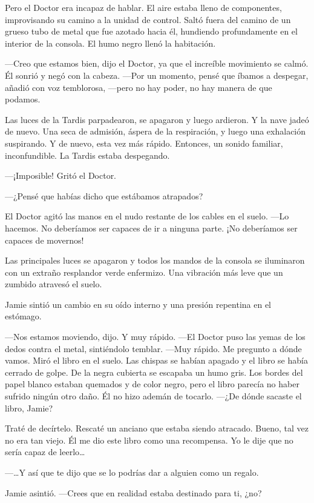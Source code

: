 Pero el Doctor era incapaz de hablar. El aire estaba lleno de
componentes, improvisando su camino a la unidad de control. Saltó fuera
del camino de un grueso tubo de metal que fue azotado hacia él,
hundiendo profundamente en el interior de la consola. El humo negro
llenó la habitación.

---Creo que estamos bien, dijo el Doctor, ya que el increíble movimiento
se calmó. Él sonrió y negó con la cabeza. ---Por un momento, pensé que
íbamos a despegar, añadió  con voz temblorosa,  ---pero no hay poder, no
hay manera de que podamos.

Las luces de la Tardis parpadearon, se apagaron y luego ardieron. Y la
nave jadeó de nuevo. Una seca de admisión, áspera de la respiración, y
luego una exhalación suspirando. Y de nuevo, esta vez más rápido.
Entonces, un sonido familiar, inconfundible. La Tardis estaba
despegando.

---¡Imposible! Gritó el Doctor.

---¿Pensé que habías dicho que estábamos atrapados?

El Doctor agitó las manos en el nudo restante de los cables en el suelo.
---Lo hacemos. No deberíamos ser capaces de ir a ninguna parte. ¡No
deberíamos ser capaces de movernos!

Las principales luces se apagaron y todos los mandos de la consola se
iluminaron con un extraño resplandor verde enfermizo. Una vibración más
leve que un zumbido  atravesó el  suelo.

Jamie sintió un cambio en su oído interno y una presión repentina en el
estómago.

---Nos estamos moviendo, dijo. Y muy rápido. ---El Doctor puso las yemas
de los dedos contra el metal, sintiéndolo temblar. ---Muy rápido. Me
pregunto a dónde vamos. Miró el libro en el suelo. Las chispas se habían
apagado y el libro se había cerrado de golpe. De la negra cubierta se
escapaba un humo gris. Los bordes del papel blanco estaban quemados y de
color negro, pero el libro parecía no haber sufrido ningún otro daño. Él
no hizo ademán de tocarlo. ---¿De dónde sacaste el libro, Jamie?

Traté de decírtelo. Rescaté un anciano que estaba siendo atracado.
Bueno, tal vez no era tan viejo. Él me dio este libro como una
recompensa. Yo le dije que no sería capaz de leerlo\ldots{}

---\ldots{}Y así que te dijo que se lo podrías dar a alguien como un
regalo.

Jamie asintió. ---Crees que en realidad estaba destinado para ti, ¿no?

